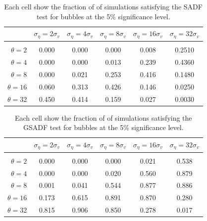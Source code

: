\documentclass[12pt]{article}
\begin{document}
\begin{table}[]
    \centering
\begin{tabular}{rccccc}
\hline  
            & \multicolumn{1}{l}{$\sigma_{\eta} =2\sigma_{v}$} & \multicolumn{1}{l}{$\sigma_{\eta} =4\sigma_{v}$} & \multicolumn{1}{l}{$\sigma_{\eta} =8\sigma_{v}$} & \multicolumn{1}{l}{$\sigma_{\eta} =16\sigma_{v}$} & \multicolumn{1}{l}{$\sigma_{\eta} =32\sigma_{v}$} \\ \hline  \vspace{-3mm} \\        
$\theta=2$                     & 0.000 & 0.000 & 0.000 & 0.008  & 0.2510 \\ \hline
$\theta=4$                    & 0.000 & 0.000 & 0.013 & 0.239  & 0.4360 \\ \hline
$\theta=8$                 & 0.000 & 0.021 & 0.253 & 0.416  & 0.1480 \\ \hline
$\theta=16$                & 0.060 & 0.313 & 0.426 & 0.146  & 0.0250 \\ \hline
$\theta=32$                 & 0.450 & 0.414 & 0.159 & 0.027  & 0.0030 \\ \hline
\end{tabular}
\caption{Each cell show the fraction of of simulations satisfying the SADF test for bubbles at the 5\% significance level.}
\label{SADFest}
\end{table}

\begin{table}[]
    \centering
\begin{tabular}{rccccc}
\hline  
            & \multicolumn{1}{l}{$\sigma_{\eta} =2\sigma_{v}$} & \multicolumn{1}{l}{$\sigma_{\eta} =4\sigma_{v}$} & \multicolumn{1}{l}{$\sigma_{\eta} =8\sigma_{v}$} & \multicolumn{1}{l}{$\sigma_{\eta} =16\sigma_{v}$} & \multicolumn{1}{l}{$\sigma_{\eta} =32\sigma_{v}$} \\ \hline  \vspace{-3mm} \\        
$\theta=2$                     & 0.000 & 0.000 & 0.000 & 0.021  & 0.538  \\ \hline
$\theta=4$                    & 0.000 & 0.000 & 0.020 & 0.560  & 0.879  \\ \hline
$\theta=8$                  & 0.001 & 0.041 & 0.544 & 0.877  & 0.886  \\ \hline
$\theta=16$                & 0.173 & 0.615 & 0.891 & 0.870  & 0.280  \\ \hline
$\theta=32$               & 0.815 & 0.906 & 0.850 & 0.278  & 0.017  \\ \hline
\end{tabular}
\caption{Each cell show the fraction of of simulations satisfying the GSADF test for bubbles at the 5\% significance level.}
\label{GSADFtest}
\end{table}
\end{document}
